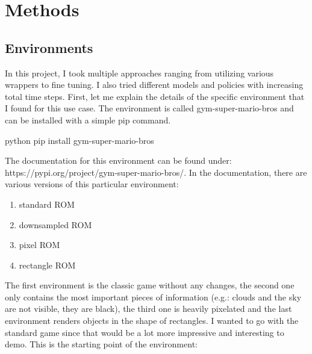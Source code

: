 \documentclass{article}
\numberwithin{equation}{section}
\numberwithin{equation}{section}
\begin{document}
\section*{Methods}

\subsection*{Environments}
In this project, I took multiple approaches ranging from utilizing various wrappers to fine tuning. I also tried different models and policies with increasing total time steps. First, let me explain the details of the specific environment that I found for this use case. The environment is called gym-super-mario-bros and can be installed with a simple pip command. 
\begin{mintedbox}{python}
pip install gym-super-mario-bros
\end{mintedbox}

The documentation for this environment can be found under: https://pypi.org/project/gym-super-mario-bros/. In the documentation, there are various versions of this particular environment:
\begin{enumerate}
\item standard ROM
\item downsampled ROM
\item pixel ROM
\item rectangle ROM
\end{enumerate}

The first environment is the classic game without any changes, the second one only contains the most important pieces of information (e.g.: clouds and the sky are not visible, they are black), the third one is heavily pixelated and the last environment renders objects in the shape of rectangles. I wanted to go with the standard game since that would be a lot more impressive and interesting to demo. This is the starting point of the environment:
\end{document}
